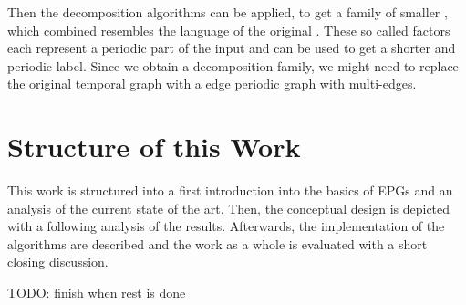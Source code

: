 Then the \DFA decomposition algorithms can be applied, to get a family of smaller \DFAs, which combined resembles the language of the original \DFA.
These so called factors each represent a periodic part of the input and can be used to get a shorter and periodic label.
Since we obtain a decomposition family, we might need to replace the original temporal graph with a edge periodic graph with multi-edges. 

\section{Structure of this Work}
\label{ch:Intoduction:sec:Structure}
This work is structured into a first introduction into the basics of EPGs and an analysis of the current state of the art.
Then, the conceptual design is depicted with a following analysis of the results.
Afterwards, the implementation of the algorithms are described and the work as a whole is evaluated with a short closing discussion.  

TODO: finish when rest is done

